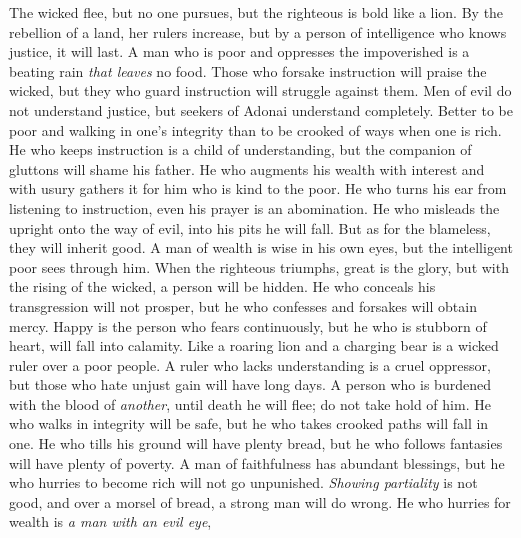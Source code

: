 \begin{biblechapter} %
\verse The wicked flee, but no one pursues, 
but the righteous is bold like a lion.
\verse By the rebellion of a land, her rulers increase, 
but by a person of intelligence who knows justice, it will last.
\verse A man who is poor and oppresses the impoverished 
is a beating rain \textit{that leaves} no food.
\verse Those who forsake instruction will praise the wicked, 
but they who guard instruction will struggle against them.
\verse Men of evil do not understand justice, 
but seekers of Adonai understand completely.
\verse Better to be poor and walking in one’s integrity 
than to be crooked of ways when one is rich.
\verse He who keeps instruction is a child of understanding, 
but the companion of gluttons will shame his father.
\verse He who augments his wealth with interest and with usury 
gathers it for him who is kind to the poor.
\verse He who turns his ear from listening to instruction, 
even his prayer is an abomination.
\verse He who misleads the upright onto the way of evil, 
into his pits he will fall. 
But as for the blameless, they will inherit good.
\verse A man of wealth is wise in his own eyes, 
but the intelligent poor sees through him.
\verse When the righteous triumphs, great is the glory, 
but with the rising of the wicked, a person will be hidden.
\verse He who conceals his transgression will not prosper, 
but he who confesses and forsakes will obtain mercy.
\verse Happy is the person who fears continuously, 
but he who is stubborn of heart, will fall into calamity.
\verse Like a roaring lion and a charging bear 
is a wicked ruler over a poor people.
\verse A ruler who lacks understanding is a cruel oppressor, 
but those who hate unjust gain will have long days.
\verse A person who is burdened with the blood of \textit{another}, 
until death he will flee; 
do not take hold of him.
\verse He who walks in integrity will be safe, 
but he who takes crooked paths will fall in one.
\verse He who tills his ground will have plenty bread, 
but he who follows fantasies will have plenty of poverty.
\verse A man of faithfulness has abundant blessings, 
but he who hurries to become rich will not go unpunished.
\verse \textit{Showing partiality} is not good, 
and over a morsel of bread, a strong man will do wrong.
\verse He who hurries for wealth is \textit{a man with an evil eye}, 

\end{biblechapter}
